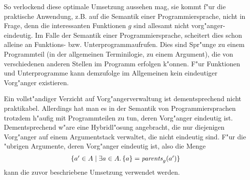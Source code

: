 \documentclass[12pt,a4paper]{article}
\begin{document}
So verlockend diese optimale Umsetzung aussehen mag, sie kommt f"ur die praktische Anwendung, z.B. auf die
Semantik einer Programmiersprache, nicht in Frage, denn die interessanten Funktionen $g$ sind allesamt
nicht vorg"anger-eindeutig. Im Falle der Semantik einer Programmiersprache, scheitert dies schon alleine
an Funktions- bzw. Unterprogrammaufrufen. Dies sind Spr"unge zu einem Programmteil (in der allgemeinen
Terminilogie, zu einem Argument), die von verschiedenen anderen Stellen im Programm erfolgen k"onnen.
F"ur Funktionen und Unterprogramme kann demzufolge im Allgemeinen kein eindeutiger Vorg"anger existieren.

Ein vollst"andiger Verzicht auf Vorg"angerverwaltung ist dementsprechend nicht praktikabel. Allerdings
hat man es in der Semantik von Programmiersprachen trotzdem h"aufig mit Programmteilen zu tun, deren
Vorg"anger eindeutig ist. Dementsprechend w"are eine Hybridl"osung angebracht, die nur diejenigen
Vorg"anger auf einem Argumentstack verwaltet, die nicht eindeutig sind. F"ur die "ubrigen Argumente,
deren Vorg"anger eindeutig ist, also die Menge
\[\begin{array}{c}
  \{a' \in A \mid \exists a \in A.\,\{a\} = \mathit{parents}_g(a')\}
\end{array}\]
kann die zuvor beschriebene Umsetzung verwendet werden.
\end{document}

